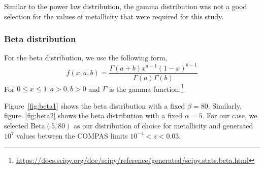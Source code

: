 Similar to the power law distribution, the gamma distribution was not a good selection for the values of metallicity that were required for this study.
\,\\\subsubsection*{\textbf{Beta distribution}}
For the beta distribution, we use the following form,
\begin{equation}
    f(x, a, b) = \frac{\Gamma(a+b)x^{a-1}(1-x)^{b-1}}{\Gamma(a)\Gamma(b)}
    \label{eq:beta_distribution}
\end{equation}
For $0 \leq x \leq 1, a > 0, b > 0$ and $\Gamma$ is the gamma function.\footnote{\url{https://docs.scipy.org/doc/scipy/reference/generated/scipy.stats.beta.html}}

Figure~\ref{fig:beta1} shows the beta distribution with a fixed $\beta=80$.
Similarly, figure~\ref{fig:beta2} shows the beta distribution with a fixed $\alpha=5$.
For our case, we selected $\text{Beta}(5, 80)$ as our distribution of choice for metallicity and generated $10^7$ values between the COMPAS limits $10^{-4} < z < 0.03$. %

